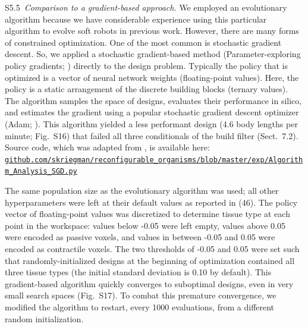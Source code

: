 \vspace{1em} 

S5.5~\textit{Comparison to a gradient-based approach.}
We employed an evolutionary algorithm because we have considerable experience using this particular algorithm to evolve soft robots in previous work. 
However, there are many forms of constrained optimization. One of the most common is stochastic gradient descent. 
So, we applied a stochastic gradient-based method (Parameter-exploring policy gradients; \cite{sehnke2010parameter}) directly to the design problem. Typically the policy that is optimized is a vector of neural network weights (floating-point values). 
Here, the policy is a static arrangement of the discrete building blocks (ternary values). 
The algorithm samples the space of designs, evaluates their performance in silico, and estimates the gradient using a popular stochastic gradient descent optimizer (Adam; \cite{kingma2014adam}). 
This algorithm yielded a less performant design (4.6 body lengths per minute; Fig.~S16) that failed all three conditionals of the build filter (Sect.~7.2). Source code, which was adapted from \cite{ha2017evolving}, is available here:
\href{https://github.com/skriegman/reconfigurable_organisms/blob/master/exp/Algorithm_Analysis_SGD.py}{\scriptsize\tt\color{blue}github.com/skriegman/reconfigurable\_organisms/blob/master/exp/Algorithm\_Analysis\_SGD.py}

\vspace{1em} 

The same population size as the evolutionary algorithm was used; all other hyperparameters were left at their default values as reported in (46). The policy vector of floating-point values was discretized to determine tissue type at each point in the workspace: values below -0.05 were left empty, values above 0.05 were encoded as passive voxels, and values in between -0.05 and 0.05 were encoded as contractile voxels. The two thresholds of -0.05 and 0.05 were set such that randomly-initialized designs at the beginning of optimization contained all three tissue types (the initial standard deviation is 0.10 by default).
This gradient-based algorithm quickly converges to suboptimal designs, even in very small search spaces (Fig.~S17). To combat this premature convergence, we modified the algorithm to restart, every 1000 evaluations, from a different random initialization.

